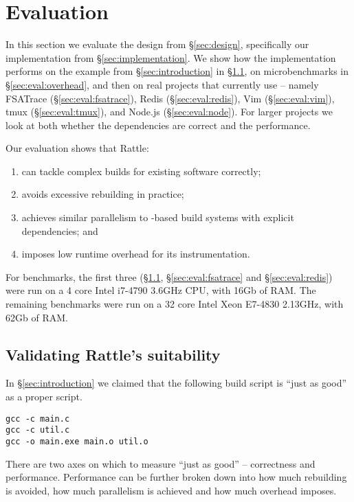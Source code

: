 \section{Evaluation}
\label{sec:evaluation}

In this section we evaluate the design from \S\ref{sec:design}, specifically our implementation from \S\ref{sec:implementation}. We show how the implementation performs on the example from \S\ref{sec:introduction} in \S\ref{sec:eval:introduction}, on microbenchmarks in \S\ref{sec:eval:overhead}, and then on real projects that currently use \Make{} -- namely FSATrace (\S\ref{sec:eval:fsatrace}), Redis (\S\ref{sec:eval:redis}), Vim (\S\ref{sec:eval:vim}), tmux (\S\ref{sec:eval:tmux}), and Node.js (\S\ref{sec:eval:node}). For larger projects we look at both whether the dependencies are correct and the performance.

Our evaluation shows that Rattle:
\begin{enumerate}
\item can tackle complex builds for existing software correctly;
\item avoids excessive rebuilding in practice;
\item achieves similar parallelism to \Make-based build systems with explicit dependencies; and
\item imposes low runtime overhead for its instrumentation.
\end{enumerate}

For benchmarks, the first three (\S\ref{sec:eval:introduction}, \S\ref{sec:eval:fsatrace} and \S\ref{sec:eval:redis}) were run on a 4 core Intel i7-4790 3.6GHz CPU, with 16Gb of RAM. The remaining benchmarks were run on a 32 core Intel Xeon E7-4830 2.13GHz, with 62Gb of RAM.

\subsection{Validating Rattle's suitability}
\label{sec:eval:introduction}

In \S\ref{sec:introduction} we claimed that the following build script is ``just as good'' as a proper \Make script.

\begin{verbatim}
gcc -c main.c
gcc -c util.c
gcc -o main.exe main.o util.o
\end{verbatim}

There are two axes on which to measure ``just as good'' -- correctness and performance. Performance can be further broken down into how much rebuilding is avoided, how much parallelism is achieved and how much overhead \Rattle imposes.

